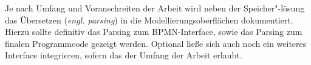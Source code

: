 \documentclass[a4paper, ngerman ]{article}
\begin{document}
\pagebreak

Je nach Umfang und Voranschreiten der Arbeit wird neben der Speicher"-lösung das Übersetzen (\textit{engl. parsing}) in die Modellierungsoberflächen dokumentiert. Hierzu sollte definitiv das Parsing zum BPMN-Interface, sowie das Parsing zum finalen Programmcode gezeigt werden. Optional ließe sich auch noch ein weiteres Interface integrieren, sofern das der Umfang der Arbeit erlaubt.
\end{document}
